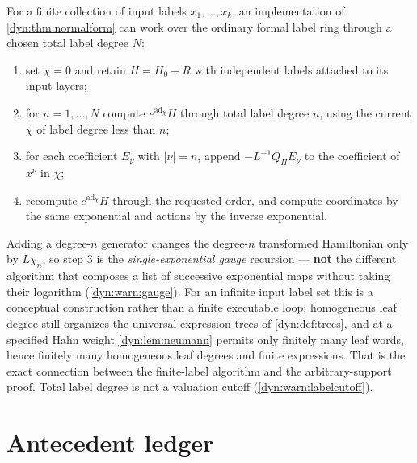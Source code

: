\documentclass[11pt,letterpaper]{article}
\theoremstyle{definition}
\theoremstyle{remark}
\newcommand{\ad}{\operatorname{ad}}
\numberwithin{equation}{section}
\begin{document}
For a finite collection of input labels $x_1,\dots,x_k$, an implementation
of \cref{dyn:thm:normalform} can work over the ordinary formal label ring
through a chosen total label degree $N$:
\begin{enumerate}[label=\arabic*.]
\item set $\chi=0$ and retain $H=H_0+R$ with independent labels attached to
its input layers;
\item for $n=1,\dots,N$ compute $e^{\ad_\chi}H$ through total label degree
$n$, using the current $\chi$ of label degree less than $n$;
\item for each coefficient $E_\nu$ with $|\nu|=n$, append
$-L^{-1}Q_\Pi E_\nu$ to the coefficient of $x^{\nu}$ in $\chi$;
\item recompute $e^{\ad_\chi}H$ through the requested order, and compute
coordinates by the same exponential and actions by the inverse exponential.
\end{enumerate}
Adding a degree-$n$ generator changes the degree-$n$ transformed Hamiltonian
only by $L\chi_n$, so step 3 is the \emph{single-exponential gauge}
recursion --- \textbf{not} the different algorithm that composes a list of
successive exponential maps without taking their logarithm
(\cref{dyn:warn:gauge}). For an infinite input label set this is a
conceptual construction rather than a finite executable loop; homogeneous
leaf degree still organizes the universal expression trees of
\cref{dyn:def:trees}, and at a specified Hahn weight
\cref{dyn:lem:neumann} permits only finitely many leaf words, hence
finitely many homogeneous leaf degrees and finite expressions. That is the
exact connection between the finite-label algorithm and the
arbitrary-support proof. Total label degree is not a valuation cutoff
(\cref{dyn:warn:labelcutoff}).

\section{Antecedent ledger}
\label{dyn:app:antecedents}
\end{document}

